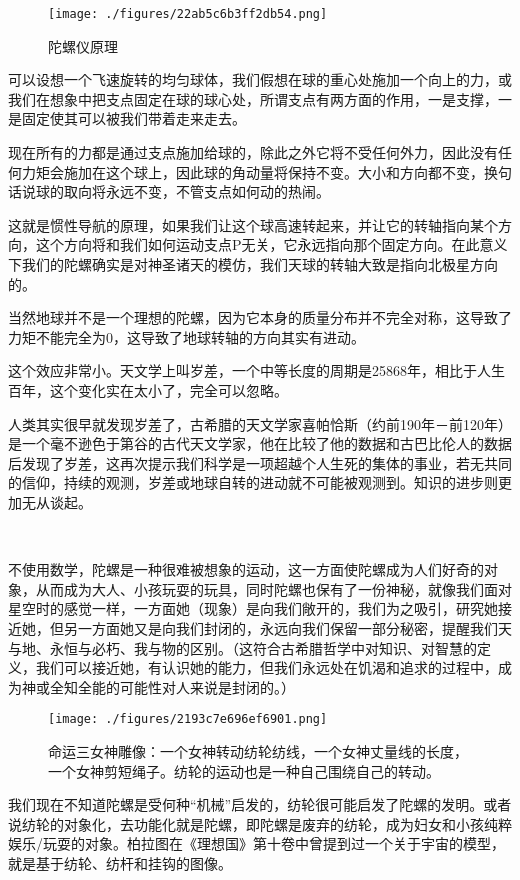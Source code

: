 \begin{figure}[ht]
\centering
\texttt{[image: ./figures/22ab5c6b3ff2db54.png]}
\caption{陀螺仪原理} \label{fig_QMPre2_7}
\end{figure}


可以设想一个飞速旋转的均匀球体，我们假想在球的重心处施加一个向上的力，或我们在想象中把支点固定在球的球心处，所谓支点有两方面的作用，一是支撑，一是固定使其可以被我们带着走来走去。

现在所有的力都是通过支点施加给球的，除此之外它将不受任何外力，因此没有任何力矩会施加在这个球上，因此球的角动量将保持不变。大小和方向都不变，换句话说球的取向将永远不变，不管支点如何动的热闹。

这就是惯性导航的原理，如果我们让这个球高速转起来，并让它的转轴指向某个方向，这个方向将和我们如何运动支点P无关，它永远指向那个固定方向。在此意义下我们的陀螺确实是对神圣诸天的模仿，我们天球的转轴大致是指向北极星方向的。

当然地球并不是一个理想的陀螺，因为它本身的质量分布并不完全对称，这导致了力矩不能完全为0，这导致了地球转轴的方向其实有进动。

这个效应非常小。天文学上叫岁差，一个中等长度的周期是25868年，相比于人生百年，这个变化实在太小了，完全可以忽略。

人类其实很早就发现岁差了，古希腊的天文学家喜帕恰斯（约前190年－前120年）是一个毫不逊色于第谷的古代天文学家，他在比较了他的数据和古巴比伦人的数据后发现了岁差，这再次提示我们科学是一项超越个人生死的集体的事业，若无共同的信仰，持续的观测，岁差或地球自转的进动就不可能被观测到。知识的进步则更加无从谈起。

~

不使用数学，陀螺是一种很难被想象的运动，这一方面使陀螺成为人们好奇的对象，从而成为大人、小孩玩耍的玩具，同时陀螺也保有了一份神秘，就像我们面对星空时的感觉一样，一方面她（现象）是向我们敞开的，我们为之吸引，研究她接近她，但另一方面她又是向我们封闭的，永远向我们保留一部分秘密，提醒我们天与地、永恒与必朽、我与物的区别。（这符合古希腊哲学中对知识、对智慧的定义，我们可以接近她，有认识她的能力，但我们永远处在饥渴和追求的过程中，成为神或全知全能的可能性对人来说是封闭的。）

\begin{figure}[ht]
\centering
\texttt{[image: ./figures/2193c7e696ef6901.png]}
\caption{ 命运三⼥神雕像：⼀个⼥神转动纺轮纺线，⼀个⼥神丈量线的长度，⼀个⼥神剪短绳⼦。纺轮的运动也是⼀种自⼰围绕自⼰的转动。} \label{fig_QMPre2_8}
\end{figure}

我们现在不知道陀螺是受何种“机械”启发的，纺轮很可能启发了陀螺的发明。或者说纺轮的对象化，去功能化就是陀螺，即陀螺是废弃的纺轮，成为妇女和小孩纯粹娱乐/玩耍的对象。柏拉图在《理想国》第十卷中曾提到过一个关于宇宙的模型，就是基于纺轮、纺杆和挂钩的图像。

